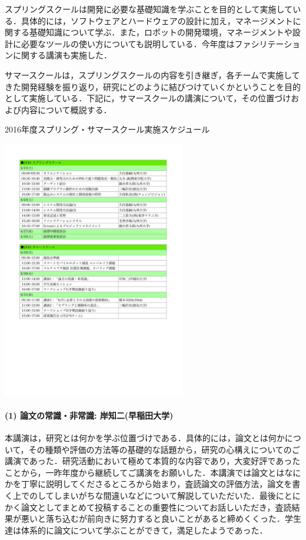 \documentclass[submit]{ipsj}
\begin{document}
スプリングスクールは開発に必要な基礎知識を学ぶことを目的として実施している．具体的には，ソフトウェアとハードウェアの設計に加え，マネージメントに関する基礎知識について学ぶ．また，ロボットの開発環境，マネージメントや設計に必要なツールの使い方についても説明している．今年度はファシリテーションに関する講演も実施した．

サマースクールは，スプリングスクールの内容を引き継ぎ，各チームで実施してきた開発経験を振り返り，研究にどのように結びつけていくかということを目的として実施している．下記に，サマースクールの講演について，その位置づけおよび内容について概説する．

\begin{table}[ht]
\caption{2016年度スプリング・サマースクール実施スケジュール}
\label{table:schedule}
\centering
\includegraphics[width=8cm]{images/schedule.pdf}
\end{table}

\paragraph*{(1) 論文の常識・非常識: 岸知二(早稲田大学)}

本講演は，研究とは何かを学ぶ位置づけである．具体的には，論文とは何かについて，その種類や評価の方法等の基礎的な話題から，研究の心構えについてのご講演であった．研究活動において極めて本質的な内容であり，大変好評であったことから，一昨年度から継続してご講演をお願いした．本講演では論文とはなにかを丁寧に説明してくださるところから始まり，査読論文の評価方法，論文を書く上でのしてしまいがちな間違いなどについて解説していただいた．最後にとにかく論文としてまとめて投稿することの重要性についてお話しいただき，査読結果が悪いと落ち込むが前向きに努力すると良いことがあると締めくくった．学生達は体系的に論文について学ぶことができて，満足したようであった．
\end{document}

